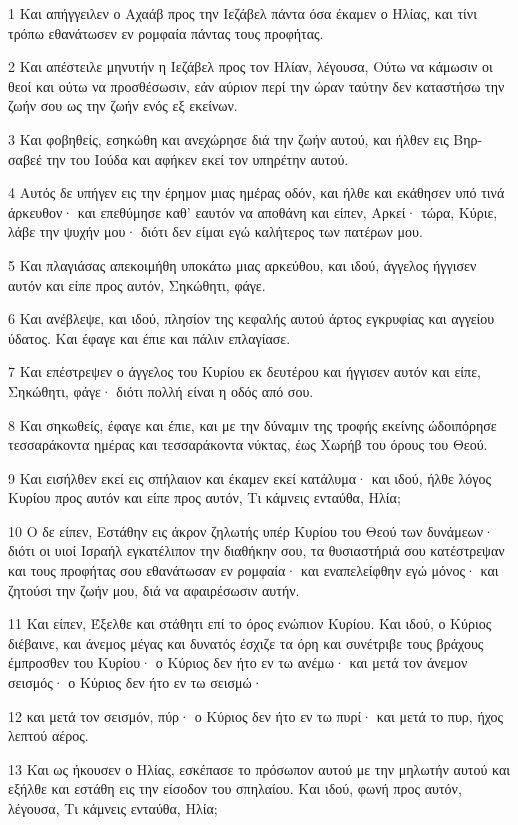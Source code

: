 \par 1 Και απήγγειλεν ο Αχαάβ προς την Ιεζάβελ πάντα όσα έκαμεν ο Ηλίας, και τίνι τρόπω εθανάτωσεν εν ρομφαία πάντας τους προφήτας.
\par 2 Και απέστειλε μηνυτήν η Ιεζάβελ προς τον Ηλίαν, λέγουσα, Ούτω να κάμωσιν οι θεοί και ούτω να προσθέσωσιν, εάν αύριον περί την ώραν ταύτην δεν καταστήσω την ζωήν σου ως την ζωήν ενός εξ εκείνων.
\par 3 Και φοβηθείς, εσηκώθη και ανεχώρησε διά την ζωήν αυτού, και ήλθεν εις Βηρ-σαβεέ την του Ιούδα και αφήκεν εκεί τον υπηρέτην αυτού.
\par 4 Αυτός δε υπήγεν εις την έρημον μιας ημέρας οδόν, και ήλθε και εκάθησεν υπό τινά άρκευθον· και επεθύμησε καθ' εαυτόν να αποθάνη και είπεν, Αρκεί· τώρα, Κύριε, λάβε την ψυχήν μου· διότι δεν είμαι εγώ καλήτερος των πατέρων μου.
\par 5 Και πλαγιάσας απεκοιμήθη υποκάτω μιας αρκεύθου, και ιδού, άγγελος ήγγισεν αυτόν και είπε προς αυτόν, Σηκώθητι, φάγε.
\par 6 Και ανέβλεψε, και ιδού, πλησίον της κεφαλής αυτού άρτος εγκρυφίας και αγγείου ύδατος. Και έφαγε και έπιε και πάλιν επλαγίασε.
\par 7 Και επέστρεψεν ο άγγελος του Κυρίου εκ δευτέρου και ήγγισεν αυτόν και είπε, Σηκώθητι, φάγε· διότι πολλή είναι η οδός από σου.
\par 8 Και σηκωθείς, έφαγε και έπιε, και με την δύναμιν της τροφής εκείνης ώδοιπόρησε τεσσαράκοντα ημέρας και τεσσαράκοντα νύκτας, έως Χωρήβ του όρους του Θεού.
\par 9 Και εισήλθεν εκεί εις σπήλαιον και έκαμεν εκεί κατάλυμα· και ιδού, ήλθε λόγος Κυρίου προς αυτόν και είπε προς αυτόν, Τι κάμνεις ενταύθα, Ηλία;
\par 10 Ο δε είπεν, Εστάθην εις άκρον ζηλωτής υπέρ Κυρίου του Θεού των δυνάμεων· διότι οι υιοί Ισραήλ εγκατέλιπον την διαθήκην σου, τα θυσιαστήριά σου κατέστρεψαν και τους προφήτας σου εθανάτωσαν εν ρομφαία· και εναπελείφθην εγώ μόνος· και ζητούσι την ζωήν μου, διά να αφαιρέσωσιν αυτήν.
\par 11 Και είπεν, Έξελθε και στάθητι επί το όρος ενώπιον Κυρίου. Και ιδού, ο Κύριος διέβαινε, και άνεμος μέγας και δυνατός έσχιζε τα όρη και συνέτριβε τους βράχους έμπροσθεν του Κυρίου· ο Κύριος δεν ήτο εν τω ανέμω· και μετά τον άνεμον σεισμός· ο Κύριος δεν ήτο εν τω σεισμώ·
\par 12 και μετά τον σεισμόν, πύρ· ο Κύριος δεν ήτο εν τω πυρί· και μετά το πυρ, ήχος λεπτού αέρος.
\par 13 Και ως ήκουσεν ο Ηλίας, εσκέπασε το πρόσωπον αυτού με την μηλωτήν αυτού και εξήλθε και εστάθη εις την είσοδον του σπηλαίου. Και ιδού, φωνή προς αυτόν, λέγουσα, Τι κάμνεις ενταύθα, Ηλία;

